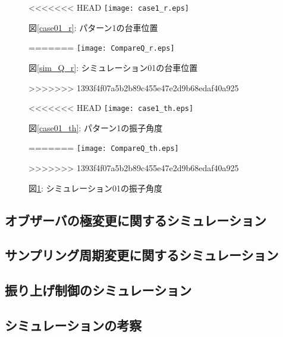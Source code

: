 \begin{figure}[htbp]
    \begin{minipage}{0.5\hsize}
        \begin{center}
<<<<<<< HEAD
            \texttt{[image: case1\_r.eps]}
            \caption{図\ref{case01_r}: パターン1の台車位置}
            \label{case01_r}
=======
            \texttt{[image: CompareQ\_r.eps]}
            \caption{図\ref{sim_Q_r}: シミュレーション01の台車位置}
            \label{sim_Q_r}
>>>>>>> 1393f4f07a5b2b89c455e47e2d9b68edaf40a925
        \end{center}
    \end{minipage}
    \begin{minipage}{0.5\hsize}
        \begin{center}
<<<<<<< HEAD
            \texttt{[image: case1\_th.eps]}
            \caption{図\ref{case01_th}: パターン1の振子角度}
            \label{case01_th}
=======
            \texttt{[image: CompareQ\_th.eps]}
            \caption{図\ref{sim_Q_th}: シミュレーション01の振子角度}
            \label{sim_Q_th}
>>>>>>> 1393f4f07a5b2b89c455e47e2d9b68edaf40a925
        \end{center}
    \end{minipage}
\end{figure}

\subsection{オブザーバの極変更に関するシミュレーション}

\subsection{サンプリング周期変更に関するシミュレーション}

\subsection{振り上げ制御のシミュレーション}

\subsection{シミュレーションの考察}

